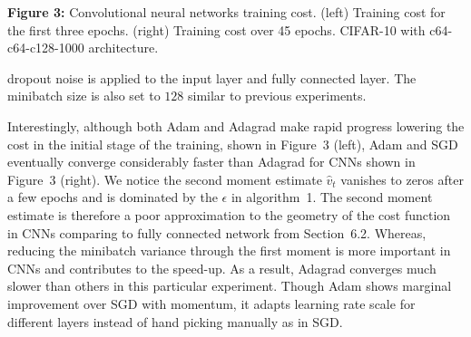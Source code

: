 \documentclass[11pt]{article}
\begin{document}
\noindent
\begin{center}
\end{center}
\vspace{0.3em}
\begin{center}
\textbf{Figure 3:} Convolutional neural networks training cost.
(left) Training cost for the first three epochs. (right)
Training cost over 45 epochs. CIFAR-10 with c64-c64-c128-1000
architecture.
\end{center}

\vspace{1em}

\noindent
dropout noise is applied to the input layer and fully connected
layer. The minibatch size is also set to $128$ similar to
previous experiments.

Interestingly, although both Adam and Adagrad make rapid
progress lowering the cost in the initial stage of the training,
shown in Figure~3 (left), Adam and SGD eventually converge
considerably faster than Adagrad for CNNs shown in Figure~3
(right). We notice the second moment estimate $\widehat{v}_t$
vanishes to zeros after a few epochs and is dominated by the
$\epsilon$ in algorithm~1. The second moment estimate is
therefore a poor approximation to the geometry of the cost
function in CNNs comparing to fully connected network from
Section~6.2. Whereas, reducing the minibatch variance through
the first moment is more important in CNNs and contributes to
the speed-up. As a result, Adagrad converges much slower than
others in this particular experiment. Though Adam shows marginal
improvement over SGD with momentum, it adapts learning rate
scale for different layers instead of hand picking manually as
in SGD.

\end{document}
